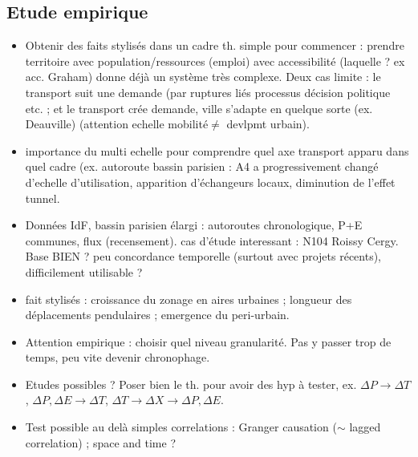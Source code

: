 \subsection*{Etude empirique}

\begin{itemize}
\item Obtenir des faits stylis{\'e}s dans un cadre th. simple pour commencer : prendre territoire avec population/ressources (emploi) avec accessibilit{\'e} (laquelle ? ex acc. Graham) donne d{\'e}j{\`a} un syst{\`e}me tr{\`e}s complexe.  Deux cas limite : le transport suit une demande (par ruptures li{\'e}s processus d{\'e}cision politique etc. ; et le transport cr{\'e}e demande, ville s'adapte en quelque sorte (ex. Deauville) (attention echelle mobilit{\'e}$\neq$ devlpmt urbain).
\item importance du multi echelle pour comprendre quel axe transport apparu dans quel cadre (ex. autoroute bassin parisien : A4 a progressivement chang{\'e} d'echelle d'utilisation, apparition d'{\'e}changeurs locaux, diminution de l'effet tunnel.
\item Donn{\'e}es IdF, bassin parisien {\'e}largi : autoroutes chronologique, P+E communes, flux (recensement). cas d'{\'e}tude interessant : N104 Roissy Cergy. Base BIEN ? peu concordance temporelle (surtout avec projets r{\'e}cents), difficilement utilisable ?
\item fait stylis{\'e}s : croissance du zonage en aires urbaines ; longueur des d{\'e}placements pendulaires ; emergence du peri-urbain.
\item Attention empirique : choisir quel niveau granularit{\'e}. Pas y passer trop de temps, peu vite devenir chronophage.
\item Etudes possibles ? Poser bien le th. pour avoir des hyp à tester, ex. $\Delta P \rightarrow \Delta T$, $\Delta P,\Delta E \rightarrow \Delta T$, $\Delta T \rightarrow \Delta X \rightarrow \Delta P, \Delta E$.
\item Test possible au del{\`a} simples correlations : Granger causation ($\sim$ lagged correlation) ; space and time ?
\end{itemize}












